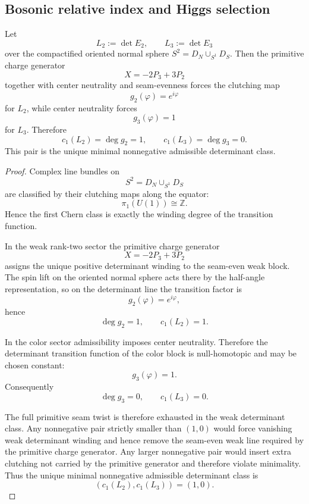 \subsection{Bosonic relative index and Higgs selection}

\begin{theorem}
\label{thm:determinant-class-higgs-selection}
\label{thm:determinant-clutching}
Let
\[
L_2:=\det E_2,
\qquad
L_3:=\det E_3
\]
over the compactified oriented normal sphere $S^2=D_N\cup_{S^1}D_S$. Then the primitive charge
generator
\[
X=-2P_3+3P_2
\]
together with center neutrality and seam-evenness forces the clutching map
\[
g_2(\varphi)=e^{i\varphi}
\]
for $L_2$, while center neutrality forces
\[
g_3(\varphi)=1
\]
for $L_3$. Therefore
\[
c_1(L_2)=\deg g_2=1,
\qquad
c_1(L_3)=\deg g_3=0.
\]
This pair is the unique minimal nonnegative admissible determinant class.
\end{theorem}

\begin{proof}
Complex line bundles on
\[
S^2=D_N\cup_{S^1}D_S
\]
are classified by their clutching maps along the equator:
\[
\pi_1(U(1))\cong \mathbb Z.
\]
Hence the first Chern class is exactly the winding degree of the transition function.

In the weak rank-two sector the primitive charge generator
\[
X=-2P_3+3P_2
\]
assigns the unique positive determinant winding to the seam-even weak block. The spin lift on the
oriented normal sphere acts there by the half-angle representation, so on the determinant line the
transition factor is
\[
g_2(\varphi)=e^{i\varphi},
\]
hence
\[
\deg g_2=1,
\qquad
c_1(L_2)=1.
\]

In the color sector admissibility imposes center neutrality. Therefore the determinant transition
function of the color block is null-homotopic and may be chosen constant:
\[
g_3(\varphi)=1.
\]
Consequently
\[
\deg g_3=0,
\qquad
c_1(L_3)=0.
\]

The full primitive seam twist is therefore exhausted in the weak determinant class. Any nonnegative
pair strictly smaller than $(1,0)$ would force vanishing weak determinant winding and hence remove
the seam-even weak line required by the primitive charge generator. Any larger nonnegative pair
would insert extra clutching not carried by the primitive generator and therefore violate
minimality. Thus the unique minimal nonnegative admissible determinant class is
\[
(c_1(L_2),c_1(L_3))=(1,0).
\]
\end{proof}

